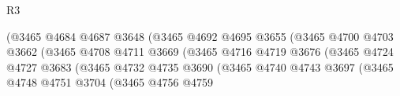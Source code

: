 \begin{lexlean}{R3}
\begin{coremodule}
                                                    (@3465
                                                      @4684
                                                      @4687
                                                      @3648
                                                      (@3465
                                                        @4692
                                                        @4695
                                                        @3655
                                                        (@3465
                                                          @4700
                                                          @4703
                                                          @3662
                                                          (@3465
                                                            @4708
                                                            @4711
                                                            @3669
                                                            (@3465
                                                              @4716
                                                              @4719
                                                              @3676
                                                              (@3465
                                                                @4724
                                                                @4727
                                                                @3683
                                                                (@3465
                                                                  @4732
                                                                  @4735
                                                                  @3690
                                                                  (@3465
                                                                    @4740
                                                                    @4743
                                                                    @3697
                                                                    (@3465
                                                                      @4748
                                                                      @4751
                                                                      @3704
                                                                      (@3465
                                                                        @4756
                                                                        @4759

\end{coremodule}
\end{lexlean}
